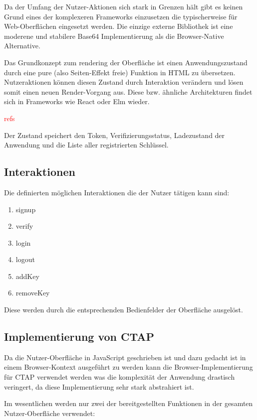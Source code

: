 \documentclass[journal]{IEEEtran}
\begin{document}
Da der Umfang der Nutzer-Aktionen sich stark in Grenzen hält gibt es keinen
Grund eines der komplexeren Frameworks einzusetzen die typischerweise für
Web-Oberflächen eingesetzt werden. Die einzige externe Bibliothek ist eine
moderene und stabilere Base64 Implementierung als die Browser-Native
Alternative.

Das Grundkonzept zum rendering der Oberfläche ist einen Anwendungszustand durch
eine pure (also Seiten-Effekt freie) Funktion in HTML zu übersetzen.
Nutzeraktionen können diesen Zustand durch Interaktion verändern und lösen
somit einen neuen Render-Vorgang aus. Diese bzw. ähnliche Architekturen findet
sich in Frameworks wie React oder Elm wieder.

\textcolor{red}{refs}

Der Zustand speichert den Token, Verifizierungsstatus, Ladezustand der
Anwendung und die Liste aller registrierten Schlüssel.

\subsection{Interaktionen}

Die definierten möglichen Interaktionen die der Nutzer tätigen kann sind:

\begin{enumerate}
	\item signup
	\item verify
	\item login
	\item logout
	\item addKey
	\item removeKey
\end{enumerate}

Diese werden durch die entsprechenden Bedienfelder der Oberfläche ausgelöst.

\subsection{Implementierung von CTAP}

Da die Nutzer-Oberfläche in JavaScript geschrieben ist und dazu gedacht ist in
einem Browser-Kontext ausgeführt zu werden kann die Browser-Implementierung für
CTAP verwendet werden was die komplexität der Anwendung drastisch veringert, da
diese Implementierung sehr stark abstrahiert ist.

Im wesentlichen werden nur zwei der bereitgestellten Funktionen in der gesamten
Nutzer-Oberfläche verwendet:
\end{document}
